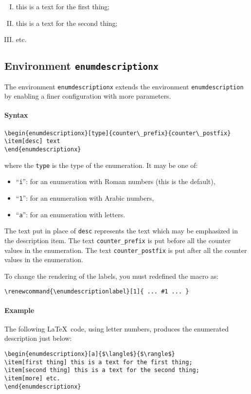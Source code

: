 \documentclass[book,taskpackage,specpackage,codepackage]{upmethodology-document}
\begin{document}
\begin{enumerate}[I.]
\item this is a text for the first thing;
\item this is a text for the second thing;
\item etc.
\end{enumerate}

\subsection{Environment \texttt{enumdescriptionx}}

The environment \texttt{enumdescriptionx} extends the environment \texttt{enumdescription} by enabling a finer configuration with more parameters.

\paragraph{Syntax}
\begin{verbatim}
\begin{enumdescriptionx}[type]{counter\_prefix}{counter\_postfix}
\item[desc] text
\end{enumdescriptionx}
\end{verbatim}
where the \texttt{type} is the type of the enumeration. It may be one of:
\begin{itemize}
\item ``\texttt{i}'': for an enumeration with Roman numbers (this is the default),
\item ``\texttt{1}'': for an enumeration with Arabic numbers,
\item ``\texttt{a}'': for an enumeration with letters.
\end{itemize}
The text put in place of \texttt{desc} represents the text which may be emphasized in the description item.
The text \texttt{counter\_prefix} is put before all the counter values in the enumeration.
The text \texttt{counter\_postfix} is put after all the counter values in the enumeration.


To change the rendering of the labels, you must redefined the macro as:
\begin{verbatim}
\renewcommand{\enumdescriptionlabel}[1]{ ... #1 ... }
\end{verbatim}


\paragraph{Example} The following \LaTeX~code, using letter numbers, produces the enumerated description just below:
\begin{verbatim}
\begin{enumdescriptionx}[a]{$\langle$}{$\rangle$}
\item[first thing] this is a text for the first thing;
\item[second thing] this is a text for the second thing;
\item[more] etc.
\end{enumdescriptionx}
\end{verbatim}
\end{document}
